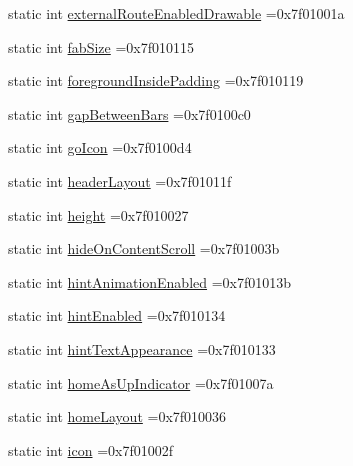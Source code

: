 \begin{DoxyCompactItemize}
\item 
static int \hyperlink{classandroid_1_1support_1_1v7_1_1cardview_1_1R_1_1attr_aedee62fbf24091473b5ad19638db6930}{external\+Route\+Enabled\+Drawable} =0x7f01001a
\item 
static int \hyperlink{classandroid_1_1support_1_1v7_1_1cardview_1_1R_1_1attr_aeac4fc5173601557638982e405fe884d}{fab\+Size} =0x7f010115
\item 
static int \hyperlink{classandroid_1_1support_1_1v7_1_1cardview_1_1R_1_1attr_a4951f8432b657bbd76d657546f7f538e}{foreground\+Inside\+Padding} =0x7f010119
\item 
static int \hyperlink{classandroid_1_1support_1_1v7_1_1cardview_1_1R_1_1attr_a80fbd1743023fac7c2382f1c969d7221}{gap\+Between\+Bars} =0x7f0100c0
\item 
static int \hyperlink{classandroid_1_1support_1_1v7_1_1cardview_1_1R_1_1attr_a6a08e9ce5755d23319ad51ea7572e4fb}{go\+Icon} =0x7f0100d4
\item 
static int \hyperlink{classandroid_1_1support_1_1v7_1_1cardview_1_1R_1_1attr_a16409e04c171c12c016138a8e5b33b47}{header\+Layout} =0x7f01011f
\item 
static int \hyperlink{classandroid_1_1support_1_1v7_1_1cardview_1_1R_1_1attr_a52501b26bd9a1de11fdf451397cb630c}{height} =0x7f010027
\item 
static int \hyperlink{classandroid_1_1support_1_1v7_1_1cardview_1_1R_1_1attr_a14d559ad97fd45b76bdbb6c0bec8ceca}{hide\+On\+Content\+Scroll} =0x7f01003b
\item 
static int \hyperlink{classandroid_1_1support_1_1v7_1_1cardview_1_1R_1_1attr_a9a1dcb3b4d6c2da9c92a7c45799fc559}{hint\+Animation\+Enabled} =0x7f01013b
\item 
static int \hyperlink{classandroid_1_1support_1_1v7_1_1cardview_1_1R_1_1attr_a0b045f46ce9994e6d9faaf73f4bbc6d8}{hint\+Enabled} =0x7f010134
\item 
static int \hyperlink{classandroid_1_1support_1_1v7_1_1cardview_1_1R_1_1attr_a2ed878930a7df30fd4612610d89e716a}{hint\+Text\+Appearance} =0x7f010133
\item 
static int \hyperlink{classandroid_1_1support_1_1v7_1_1cardview_1_1R_1_1attr_a3d5f180614304935612a39e384a7c14a}{home\+As\+Up\+Indicator} =0x7f01007a
\item 
static int \hyperlink{classandroid_1_1support_1_1v7_1_1cardview_1_1R_1_1attr_a0576ee185b32fbfd1a3a5cb94886e8d3}{home\+Layout} =0x7f010036
\item 
static int \hyperlink{classandroid_1_1support_1_1v7_1_1cardview_1_1R_1_1attr_a9d627427d4722257934c98eb559831e1}{icon} =0x7f01002f

\end{DoxyCompactItemize}
